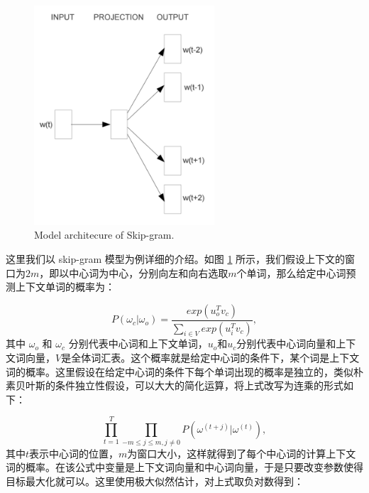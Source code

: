 \begin{figure}[!htp]
\centering
\includegraphics[width=0.6\textwidth]  {imgs/skip-gram.png} \\
    {Model architecure of Skip-gram\cite{mikolov2013distributed}.}
\label{fig:skip-gram}
\end{figure}

这里我们以 skip-gram 模型为例详细的介绍。如图 \ref{fig:skip-gram} 所示，我们假设上下文的窗口为$2m$，即以中心词为中心，分别向左和向右选取$m$个单词，那么给定中心词预测上下文单词的概率为：

\begin{equation}
    P(\omega_c|\omega_o) = \frac{exp(u_o^{T} v_c)}{\sum_{i \in V} exp(u_i^{T} v_c)},
\end{equation}
其中 $\omega_o$ 和 $\omega_c$ 分别代表中心词和上下文单词，$u_o$和$u_c$分别代表中心词向量和上下文词向量，$V$是全体词汇表。这个概率就是给定中心词的条件下，某个词是上下文词的概率。这里假设在给定中心词的条件下每个单词出现的概率是独立的，类似朴素贝叶斯的条件独立性假设，可以大大的简化运算，将上式改写为连乘的形式如下：

\begin{equation}
   \prod \limits_{t=1}^T \prod \limits_{-m\leq j \leq m, j \neq 0} P(\omega^{(t+j)}|\omega^{(t)}),
\end{equation}
其中$t$表示中心词的位置，$m$为窗口大小，这样就得到了每个中心词的计算上下文词的概率。在该公式中变量是上下文词向量和中心词向量，于是只要改变参数使得目标最大化就可以。这里使用极大似然估计，对上式取负对数得到：

